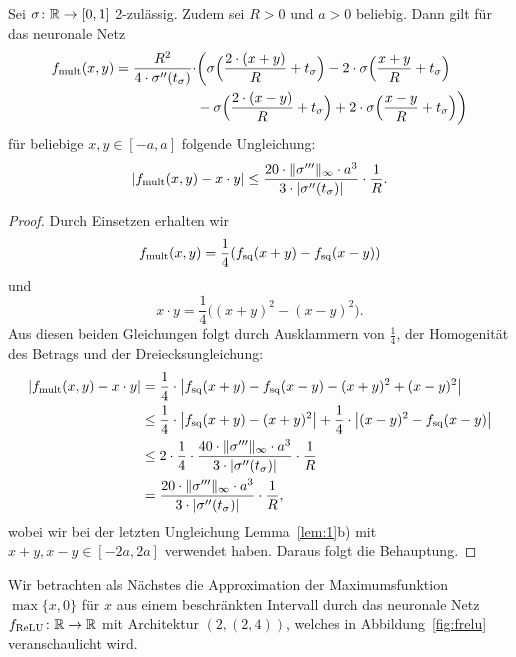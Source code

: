 \begin{lem}
  \label{lem:2}
  Sei $\sigma \colon \mathbb{R} \to [0, 1]$ 2-zulässig. Zudem sei $R > 0$ und $a > 0$ beliebig. Dann gilt für das neuronale Netz
  \begin{equation*}
  	\begin{split}
  	f_{\mathrm{mult}}(x, y) = \frac{R^2}{4 \cdot \sigma''(t_{\sigma})} \cdot & \bigg(\sigma\Big(\frac{2 \cdot (x + y)}{R} + t_{\sigma} \Big) - 2 \cdot \sigma\Big(\frac{x + y}{R} + t_{\sigma}\Big) \\
  	& - \sigma \Big(\frac{2 \cdot (x - y)}{R} + t_{\sigma} \Big) + 2 \cdot \sigma \Big(\frac{x - y}{R} + t_{\sigma} \Big) \bigg)
  	\end{split}
  	\end{equation*}
  	für beliebige $x, y \in [-a, a]$ folgende Ungleichung:
  	$$|f_{\mathrm{mult}}(x, y) - x \cdot y| \leq \frac{20 \cdot \|\sigma'''\|_{\infty} \cdot a ^3}{3 \cdot |\sigma''(t_{\sigma})|} \cdot \frac{1}{R}.$$
  \end{lem}
  \begin{proof}
  Durch Einsetzen erhalten wir $$f_{\mathrm{mult}}(x,y) = \frac{1}{4}(f_{\mathrm{sq}}(x + y) - f_{\mathrm{sq}}(x - y))$$ und $$x \cdot y = \frac{1}{4}\big((x + y)^2 - (x - y)^2\big).$$
  Aus diesen beiden Gleichungen folgt durch Ausklammern von $\frac{1}{4}$, der Homogenität des Betrags und der Dreiecksungleichung:
  \begin{equation*}
  \begin{split}
  |f_{\mathrm{mult}}(x, y) - x \cdot y| & = \frac{1}{4} \cdot \big|f_{\mathrm{sq}}(x + y) - f_{\mathrm{sq}}(x - y) - (x + y)^2 + (x - y)^2\big| \\
  & \leq \frac{1}{4} \cdot \big|f_{\mathrm{sq}}(x + y) - (x + y)^2\big| + \frac{1}{4}\cdot\big| (x - y)^2 - f_{\mathrm{sq}}(x - y)\big| \\
  & \leq 2 \cdot \frac{1}{4} \cdot \frac{40 \cdot \|\sigma'''\|_{\infty} \cdot a^3}{3 \cdot |\sigma''(t_{\sigma})|} \cdot \frac{1}{R} \\
  & = \frac{20 \cdot \|\sigma'''\|_{\infty} \cdot a ^3}{3 \cdot |\sigma''(t_{\sigma})|} \cdot \frac{1}{R},
  \end{split}
\end{equation*}   
wobei wir bei der letzten Ungleichung Lemma~\ref{lem:1}b) mit $x + y, x - y \in [-2a, 2a]$ verwendet haben. Daraus folgt die Behauptung.
  \end{proof}
Wir betrachten als Nächstes die Approximation der Maximumsfunktion $\max\{x, 0\}$ für $x$ aus einem beschränkten Intervall durch das neuronale Netz $f_{\mathrm{ReLU}}\colon \mathbb{R} \to \mathbb{R}$ mit Architektur $(2,(2,4))$, welches in Abbildung~\ref{fig:frelu} veranschaulicht wird.

